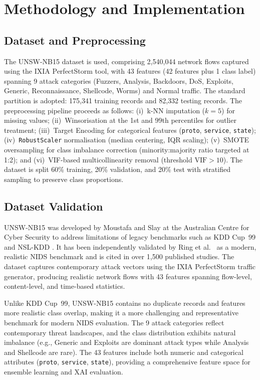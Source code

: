 \documentclass[conference]{IEEEtran}
\begin{document}
\section{Methodology and Implementation}

\subsection{Dataset and Preprocessing}

The UNSW-NB15 dataset \cite{moustafa2015} is used, comprising 2{,}540{,}044 network flows captured using the IXIA PerfectStorm tool, with 43 features (42 features plus 1 class label) spanning 9 attack categories (Fuzzers, Analysis, Backdoors, DoS, Exploits, Generic, Reconnaissance, Shellcode, Worms) and Normal traffic. The standard partition is adopted: 175{,}341 training records and 82{,}332 testing records. The preprocessing pipeline proceeds as follows: (i)~k-NN imputation ($k=5$) for missing values; (ii)~Winsorisation at the 1st and 99th percentiles for outlier treatment; (iii)~Target Encoding for categorical features (\texttt{proto}, \texttt{service}, \texttt{state}); (iv)~\texttt{RobustScaler} normalisation (median centering, IQR scaling); (v)~SMOTE oversampling for class imbalance correction (minority:majority ratio targeted at 1:2); and (vi)~VIF-based multicollinearity removal (threshold $\text{VIF} > 10$). The dataset is split 60\% training, 20\% validation, and 20\% test with stratified sampling to preserve class proportions.

\subsection{Dataset Validation}

UNSW-NB15 was developed by Moustafa and Slay \cite{moustafa2015} at the Australian Centre for Cyber Security to address limitations of legacy benchmarks such as KDD Cup~99 and NSL-KDD \cite{tavallaee2009}. It has been independently validated by Ring et al.~\cite{ring2019} as a modern, realistic NIDS benchmark and is cited in over 1{,}500 published studies. The dataset captures contemporary attack vectors using the IXIA PerfectStorm traffic generator, producing realistic network flows with 43 features spanning flow-level, content-level, and time-based statistics.

Unlike KDD Cup~99, UNSW-NB15 contains no duplicate records and features more realistic class overlap, making it a more challenging and representative benchmark for modern NIDS evaluation. The 9 attack categories reflect contemporary threat landscapes, and the class distribution exhibits natural imbalance (e.g., Generic and Exploits are dominant attack types while Analysis and Shellcode are rare). The 43 features include both numeric and categorical attributes (\texttt{proto}, \texttt{service}, \texttt{state}), providing a comprehensive feature space for ensemble learning and XAI evaluation.
\end{document}
